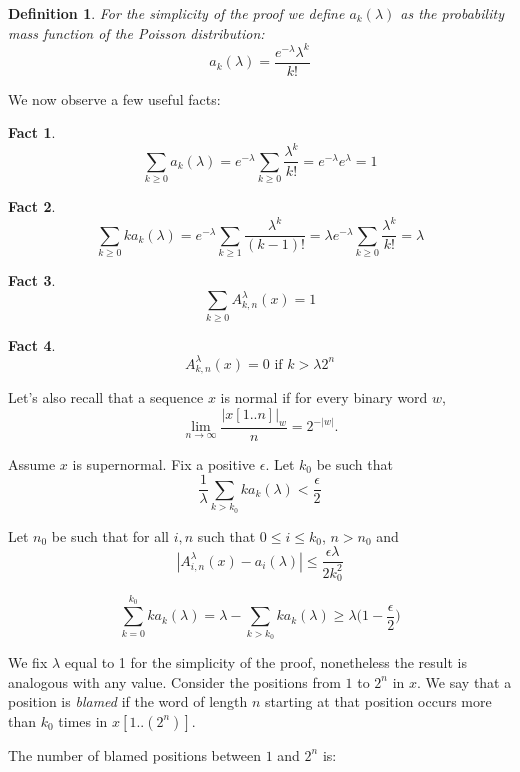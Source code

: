 \documentclass[11pt,a4paper]{tesis}
\newtheorem{fact}{Fact}[]
\newtheorem{definition}{Definition}[]
\begin{document}
\begin{definition} 
  For the simplicity of the proof we define $a_k(\lambda)$ as the probability mass function of the Poisson distribution:
   $$a_k(\lambda) = \frac{e^{-\lambda}\lambda^k}{k!}$$
\end{definition}

We now observe a few useful facts:

\begin{fact}
    $$\sum_{k \geq 0} a_k(\lambda) = e^{-\lambda}\sum_{k \geq 0} \frac{\lambda^k}{k!} = e^{-\lambda}e^{\lambda} = 1$$
\end{fact}

\begin{fact}
    $$\sum_{k \geq 0} ka_k(\lambda) = e^{-\lambda}\sum_{k \geq 1} \frac{\lambda^k}{(k-1)!} = \lambda e^{-\lambda} \sum_{k \geq 0} \frac{\lambda^k}{k!}= \lambda$$
\end{fact}





\begin{fact}
    $$\sum_{k \geq 0} A^{\lambda}_{k,n}(x) = 1$$
\end{fact}

\begin{fact}
    $$A^{\lambda}_{k,n}(x) = 0 \textrm{ if } k > \lambda2^n$$
\end{fact}


Let's also recall that a sequence $x$ is normal if  for every binary word $w$,
\[
\lim_{n\to\infty} \frac{|x[1..n]|_w}{n}= 2^{-|w|}.
\]

Assume  $x$ is supernormal.
Fix a positive $\epsilon$.
Let $k_0$ be such that 
$$\frac{1}{\lambda} \sum_{k > k_0} ka_k(\lambda) < \frac{\epsilon}{2}$$

Let $n_0$ be  such that  for all 
$ i,n$ such that $  0 \leq i \leq k_0 $, $n > n_0$ and 
  $$|A^\lambda_{i,n}(x) - a_i(\lambda)| \leq \frac{\epsilon\lambda}{2k_0^2}$$


 $$\sum_{k=0}^{k_0} ka_k(\lambda) = \lambda - \sum_{k> k_0} ka_k(\lambda) \geq \lambda\Big(1 - \frac{\epsilon}{2}\Big)$$


We fix $\lambda$ equal to 1 for the simplicity of the proof, nonetheless the result is analogous with any value.
Consider the positions from $1$ to $ 2^n $ in $x$. 
We say that a position is \textit{blamed} if the word of length $n$ starting at that position 
occurs more than $k_0$ times in 
 $x[1..(2^n)]$. 

 The number of blamed positions 
 between  $1$ and $2^n$ is:
\end{document}
